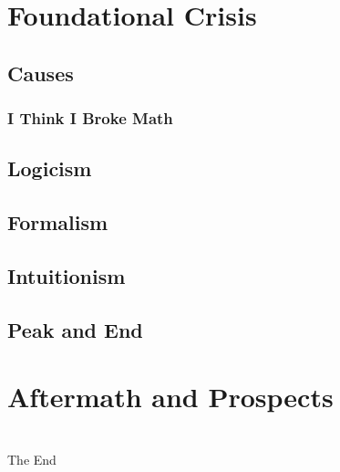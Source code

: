 \documentclass{beamer}
\begin{document}
\section{Foundational Crisis}
\subsection{Causes}
\begin{frame}
    \frametitle{I Think I Broke Math}
\end{frame}
\subsection{Logicism}
\begin{frame}
    \frametitle{}
\end{frame}
\subsection{Formalism}
\begin{frame}
    \frametitle{}
\end{frame}
\subsection{Intuitionism}
\begin{frame}
    \frametitle{}
\end{frame}
\subsection{Peak and End}
\begin{frame}
    \frametitle{}
\end{frame}
\section{Aftermath and Prospects}
\begin{frame}
    \frametitle{}
\end{frame}
\section*{}
\begin{frame}
    \Huge{\centerline{The End}}
\end{frame}
\end{document}
